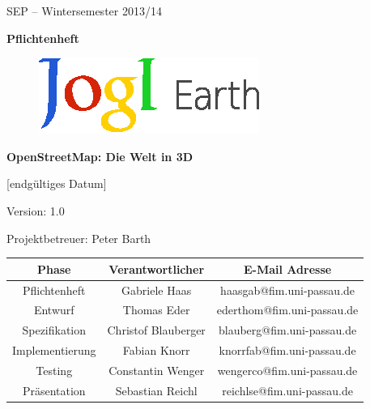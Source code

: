 \documentclass[10pt]{scrreprt}
\begin{document}
\begin{center}
\vspace{2.0 cm}
{\LARGE SEP – Wintersemester 2013/14}

\vspace{1.0 cm}
\textbf{{\Huge Pflichtenheft}}

\vspace{0.8 cm}
\begin{figure}[!htb]
\begin{center}
	\includegraphics[scale=1.5]{Logo-Print.eps}
\end{center}
\end{figure}

\vspace{0.2 cm}
\textbf{{\huge OpenStreetMap: Die Welt in 3D}}

\vspace{1.5 cm}
[endgültiges Datum]

\vspace{0.5 cm}
Version: 1.0

\vspace{1.5 cm}
{\Large Projektbetreuer: Peter Barth}

\vspace{1.5 cm}
\begin{tabular}{|c|c|c|}
\hline 
\rule[-1ex]{0pt}{4ex} \textbf{Phase} & \textbf{Verantwortlicher} & \textbf{E-Mail Adresse} \\ 
\hline  \hline
\rule[-1ex]{0pt}{4ex} Pflichtenheft & Gabriele Haas & haasgab@fim.uni-passau.de \\ 
\hline  \hline
\rule[-1ex]{0pt}{4ex} Entwurf & Thomas Eder & ederthom@fim.uni-passau.de \\ 
\hline  \hline
\rule[-1ex]{0pt}{4ex} Spezifikation & Christof Blauberger & blauberg@fim.uni-passau.de \\ 
\hline  \hline
\rule[-1ex]{0pt}{4ex} Implementierung & Fabian Knorr & knorrfab@fim.uni-passau.de \\ 
\hline \hline 
\rule[-1ex]{0pt}{4ex} Testing & Constantin Wenger & wengerco@fim.uni-passau.de \\ 
\hline  \hline
\rule[-1ex]{0pt}{4ex} Präsentation & Sebastian Reichl & reichlse@fim.uni-passau.de \\ 
\hline 
\end{tabular}

\end{center}
\end{document}

